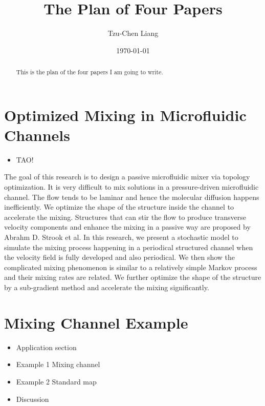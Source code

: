 \documentclass{article}
\title{The Plan of Four Papers}
\author{Tzu-Chen Liang}
\date{\today}
\begin{document}
\maketitle

\begin{abstract}
This is the plan of the four papers I am going to write.

\end{abstract}


\section{Optimized Mixing in Microfluidic Channels}

 \begin{itemize}
   \item TAO!
 \end{itemize}
The goal of this research is to design a passive microfluidic mixer via topology optimization. It is very difficult to mix solutions in a pressure-driven microfluidic channel. The flow tends to be laminar and hence the molecular diffusion happens inefficiently. We optimize the shape of the structure inside the channel to accelerate the mixing. Structures that can stir the flow to produce transverse velocity components and enhance the mixing in a passive way are proposed by Abrahm D. Strook et al. In this research, we present a stochastic model to simulate the mixing process happening in a periodical structured channel when the velocity field is fully developed and also periodical. We then show the complicated mixing phenomenon is similar to a relatively simple Markov process and their mixing rates are related. We further optimize the shape of the structure by a sub-gradient method and accelerate the mixing significantly.

\section{Mixing Channel Example}

 \begin{itemize}
   \item Application section
   \item Example 1 Mixing channel
   \item Example 2 Standard map
   \item Discussion
 \end{itemize}
\end{document}
